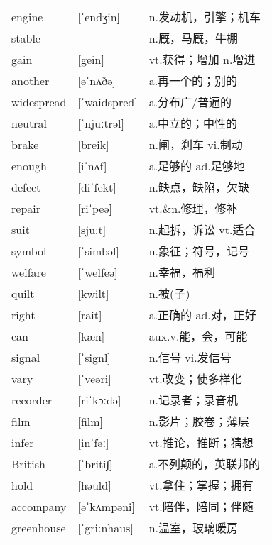 \documentclass[a4paper]{article}
\begin{document}
\section{}
\begin{tabular}{l l l}

engine & [ˈendʒin] & n.发动机，引擎；机车 \\
stable &  & n.厩，马厩，牛棚 \\
gain & [gein] & vt.获得；增加 n.增进 \\
another & [əˈnʌðə] & a.再一个的；别的 \\
widespread & [ˈwaidspred] & a.分布广/普遍的 \\
neutral & [ˈnjuːtrəl] & a.中立的；中性的 \\
brake & [breik] & n.闸，刹车 vi.制动 \\
enough & [iˈnʌf] & a.足够的 ad.足够地 \\
defect & [diˈfekt] & n.缺点，缺陷，欠缺 \\
repair & [riˈpeə] & vt.\&n.修理，修补 \\
suit & [sjuːt] & n.起拆，诉讼 vt.适合 \\
symbol & [ˈsimbəl] & n.象征；符号，记号 \\
welfare & [ˈwelfeə] & n.幸福，福利 \\
quilt & [kwilt] & n.被(子) \\
right & [rait] & a.正确的 ad.对，正好 \\
can & [kæn] & aux.v.能，会，可能 \\
signal & [ˈsignl] & n.信号 vi.发信号 \\
vary & [ˈveəri] & vt.改变；使多样化 \\
recorder & [riˈkɔːdə] & n.记录者；录音机 \\
film & [film] & n.影片；胶卷；薄层 \\
infer & [inˈfəː] & vt.推论，推断；猜想 \\
British & [ˈbriti∫] & a.不列颠的，英联邦的 \\
hold & [həuld] & vt.拿住；掌握；拥有 \\
accompany & [əˈkʌmpəni] & vt.陪伴，陪同；伴随 \\
greenhouse & [ˈgriːnhaus] & n.温室，玻璃暖房 \\

\end{tabular}
\end{document}
